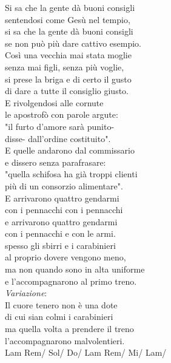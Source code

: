 \documentclass[10pt, twoside, a4paper]{article}
\begin{document}
\begin{multicols}{2}
Si sa che la gente d\`a buoni consigli \\
sentendosi come Ges\`u nel tempio, \\
si sa che la gente d\`a buoni consigli \\
se non pu\`o pi\`u dare cattivo esempio. \\

Cos\`i una vecchia mai stata moglie \\
senza mai figli, senza pi\`u voglie, \\
si prese la briga e di certo il gusto \\
di dare a tutte il consiglio giusto. \\

E rivolgendosi alle cornute \\
le apostrof\`o con parole argute: \\
"il furto d'amore sar\`a punito- \\
disse- dall'ordine costituito". \\

E quelle andarono dal commissario \\
e dissero senza parafrasare: \\
"quella schifosa ha gi\`a troppi clienti \\
pi\`u di un consorzio alimentare". \\

E arrivarono quattro gendarmi \\
con i pennacchi con i pennacchi \\
e arrivarono quattro gendarmi \\
con i pennacchi e con le armi. \\

spesso gli sbirri e i carabinieri \\
al proprio dovere vengono meno, \\
ma non quando sono in alta uniforme \\
e l'accompagnarono al primo treno. \\

\textit{Variazione}:\\
\textcolor{white}{}\hspace{36pt}Il cuore tenero non \`e una dote \\
\textcolor{white}{}\hspace{36pt}di cui sian colmi i carabinieri \\
\textcolor{white}{}\hspace{36pt}ma quella volta a prendere il treno \\
\textcolor{white}{}\hspace{36pt}l'accompagnarono malvolentieri. \\

Lam Rem/ Sol/ Do/ Lam Rem/ Mi/ Lam/
\end{multicols}
\newpage
\end{document}
